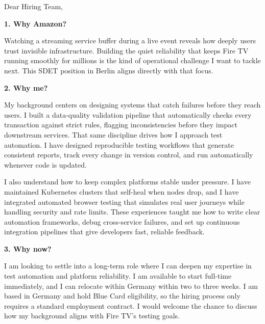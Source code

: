 \documentclass[11pt,a4paper]{coverletter}
\begin{document}

\opening{Dear Hiring Team,}

\vspace{8pt}\noindent\textbf{1. Why Amazon?}\par\vspace{3pt}

Watching a streaming service buffer during a live event reveals how deeply users trust invisible infrastructure. Building the quiet reliability that keeps Fire TV running smoothly for millions is the kind of operational challenge I want to tackle next. This SDET position in Berlin aligns directly with that focus.

\vspace{8pt}\noindent\textbf{2. Why me?}\par\vspace{3pt}

My background centers on designing systems that catch failures before they reach users. I built a data-quality validation pipeline that automatically checks every transaction against strict rules, flagging inconsistencies before they impact downstream services. That same discipline drives how I approach test automation. I have designed reproducible testing workflows that generate consistent reports, track every change in version control, and run automatically whenever code is updated.

I also understand how to keep complex platforms stable under pressure. I have maintained Kubernetes clusters that self-heal when nodes drop, and I have integrated automated browser testing that simulates real user journeys while handling security and rate limits. These experiences taught me how to write clear automation frameworks, debug cross-service failures, and set up continuous integration pipelines that give developers fast, reliable feedback.

\vspace{8pt}\noindent\textbf{3. Why now?}\par\vspace{3pt}

I am looking to settle into a long-term role where I can deepen my expertise in test automation and platform reliability. I am available to start full-time immediately, and I can relocate within Germany within two to three weeks. I am based in Germany and hold Blue Card eligibility, so the hiring process only requires a standard employment contract. I would welcome the chance to discuss how my background aligns with Fire TV’s testing goals.
\end{document}
